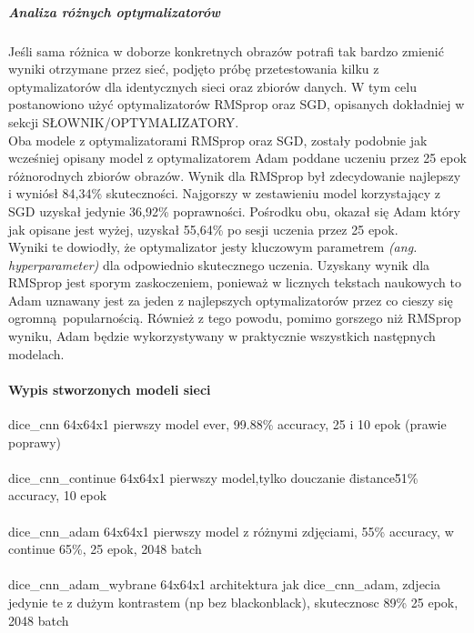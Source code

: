 \subparagraph{Analiza różnych optymalizatorów}
Jeśli sama różnica w doborze konkretnych obrazów potrafi tak bardzo zmienić wyniki
otrzymane przez sieć, podjęto próbę przetestowania kilku z optymalizatorów dla
identycznych sieci oraz zbiorów danych. W tym celu postanowiono użyć optymalizatorów
RMSprop oraz SGD, opisanych dokładniej w sekcji SŁOWNIK/OPTYMALIZATORY.\\

Oba modele z optymalizatorami RMSprop oraz SGD, zostały podobnie jak wcześniej opisany
model z optymalizatorem Adam poddane uczeniu przez 25 epok różnorodnych zbiorów obrazów.
Wynik dla RMSprop był zdecydowanie najlepszy i wyniósł 84,34\% skuteczności.
Najgorszy w zestawieniu model korzystający z SGD uzyskał jedynie 36,92\% poprawności.
Pośrodku obu, okazał się Adam który jak opisane jest wyżej, uzyskał 55,64\% po sesji
uczenia przez 25 epok.\\
Wyniki te dowiodły, że optymalizator jesty kluczowym parametrem \textit{(ang. hyperparameter)}
dla odpowiednio skutecznego uczenia. Uzyskany wynik dla RMSprop jest sporym zaskoczeniem,
ponieważ w licznych tekstach naukowych to Adam uznawany jest za jeden z najlepszych
optymalizatorów przez co cieszy się ogromną popularnością. Również z tego powodu, pomimo
gorszego niż RMSprop wyniku, Adam będzie wykorzystywany w praktycznie wszystkich następnych
modelach.

\paragraph{Wypis stworzonych modeli sieci}

dice_cnn 64x64x1 pierwszy model ever, 99.88\% accuracy, 25 i 10 epok (prawie poprawy) \\\\

dice_cnn_continue 64x64x1 pierwszy model,tylko douczanie \"distance\" 51\% accuracy, 10 epok \\\\

dice_cnn_adam 64x64x1 pierwszy model z różnymi zdjęciami, 55\% accuracy, w continue 65\%, 25 epok, 2048 batch\\\\

dice_cnn_adam_wybrane 64x64x1 architektura jak dice_cnn_adam, zdjecia jedynie te z dużym
kontrastem (np bez blackonblack), skutecznosc 89\% 25 epok, 2048 batch \\\\

